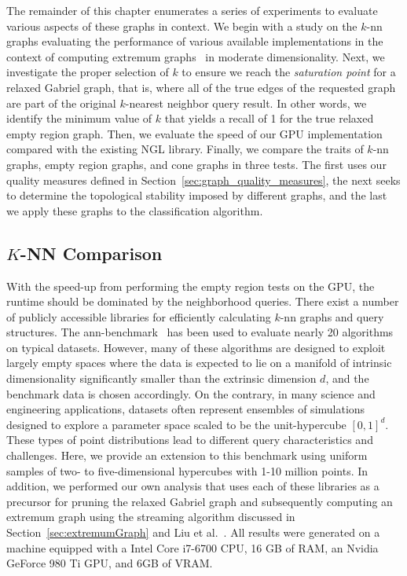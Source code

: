The remainder of this chapter enumerates a series of experiments to evaluate various aspects of these graphs in context.
%
We begin with a study on the $k$-nn graphs evaluating the performance of various available implementations in the context of computing extremum graphs~\cite{CorreaLindstromBremer2011} in moderate dimensionality.
%
Next, we investigate the proper selection of $k$ to ensure we reach the \textit{saturation point} for a relaxed Gabriel graph, that is, where all of the true edges of the requested graph are part of the original $k$-nearest neighbor query result.
%
In other words, we identify the minimum value of $k$ that yields a recall of 1 for the true relaxed empty region graph.
%
Then, we evaluate the speed of our GPU implementation compared with the existing NGL library.
%
Finally, we compare the traits of $k$-nn graphs, empty region graphs, and cone graphs in three tests.
%
The first uses our quality measures defined in Section~\ref{sec:graph_quality_measures}, the next seeks to determine the topological stability imposed by different graphs, and the last we apply these graphs to the classification algorithm.

\subsection{$K$-NN Comparison}
\label{sec:knn_benchmark}

With the speed-up from performing the empty region tests on the GPU, the runtime should be dominated by the neighborhood queries.
%
There exist a number of publicly accessible libraries for efficiently calculating $k$-nn graphs and query structures.
%
The ann-benchmark~\cite{AumullerBernhardssonFaithfull2018} has been used to evaluate nearly 20 algorithms on typical datasets.
%
However, many of these algorithms are designed to exploit largely empty spaces where the data is expected to lie on a manifold of intrinsic dimensionality significantly smaller than the extrinsic dimension $d$, and the benchmark data is chosen accordingly.
%
On the contrary, in many science and engineering applications, datasets often represent ensembles of simulations designed to explore a parameter space scaled to be the unit-hypercube $[0,1]^d$.
%
These types of point distributions lead to different query characteristics and challenges.
%
Here, we provide an extension to this benchmark using uniform samples of two- to five-dimensional hypercubes with 1-10 million points.
%
In addition, we performed our own analysis that uses each of these libraries as a precursor for pruning the relaxed Gabriel graph and subsequently computing an extremum graph using the streaming algorithm discussed in Section~\ref{sec:extremumGraph} and Liu et al.~\cite{LiuWangMaljovec2019}.
%
All results were generated on a machine equipped with a Intel Core i7-6700 CPU, 16 GB of RAM, an Nvidia GeForce 980 Ti GPU, and 6GB of VRAM.

